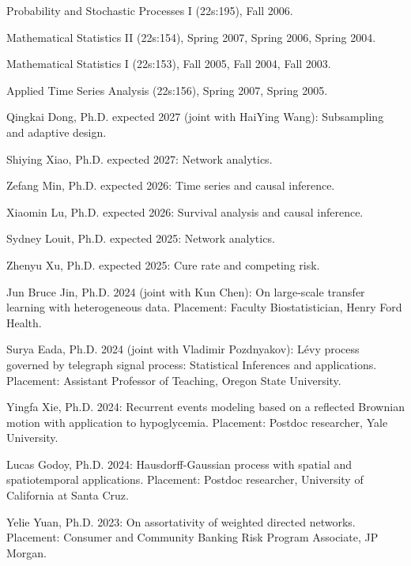 \documentclass[Statistics]{vita}
\begin{document}
\begin{vita}
\begin{TeachingExperience}
\begin{UConn}
    \end{UConn}
    \begin{UIowa}
    \item Probability and Stochastic Processes I (22s:195), Fall 2006.
    \item Mathematical Statistics II (22s:154), Spring 2007, Spring 2006, Spring 2004.
    \item Mathematical Statistics I (22s:153), Fall 2005, Fall 2004, Fall 2003.
    \item Applied Time Series Analysis (22s:156), Spring 2007, Spring 2005.
    \end{UIowa}
  \end{TeachingExperience}
  \begin{Students}
    \begin{Ph.D.}
    \item Qingkai Dong, Ph.D. expected 2027 (joint with HaiYing Wang): Subsampling and adaptive design.
    \item Shiying Xiao, Ph.D. expected 2027: Network analytics.
    \item Zefang Min, Ph.D. expected 2026: Time series and causal inference.
    \item Xiaomin Lu, Ph.D. expected 2026: Survival analysis and causal inference.
    \item Sydney Louit, Ph.D. expected 2025: Network analytics.
    \item Zhenyu Xu, Ph.D. expected 2025: Cure rate and competing risk.
    \item Jun Bruce Jin, Ph.D. 2024 (joint with Kun Chen): On large-scale transfer learning with heterogeneous data. Placement: Faculty Biostatistician, Henry Ford Health.
    \item Surya Eada, Ph.D. 2024 (joint with Vladimir Pozdnyakov): L\'evy process governed by telegraph signal process: Statistical Inferences and applications. Placement: Assistant Professor of Teaching, Oregon State University.
    \item Yingfa Xie, Ph.D. 2024: Recurrent events modeling based on a reflected Brownian motion with application to hypoglycemia. Placement: Postdoc researcher, Yale University.
    \item Lucas Godoy, Ph.D. 2024: Hausdorff-Gaussian process with spatial and spatiotemporal applications. Placement: Postdoc researcher, University of California at Santa Cruz.
    \item Yelie Yuan, Ph.D. 2023: On assortativity of weighted directed networks. Placement: Consumer and Community Banking Risk Program Associate,  JP Morgan.

\end{Ph.D.}
\end{Students}
\end{vita}
\end{document}
